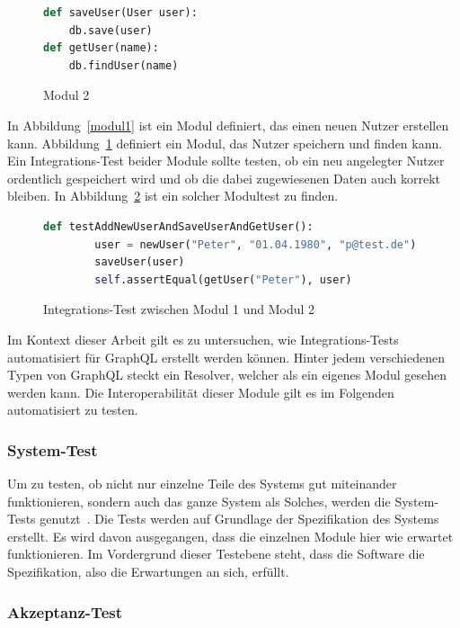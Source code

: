 \begin{figure}[h!]
    \begin{lstlisting}[language=Python]
def saveUser(User user):
    db.save(user)
def getUser(name):
    db.findUser(name)
    \end{lstlisting}
    \caption{Modul 2}
    \label{modul2}
\end{figure}

In Abbildung~\ref{modul1} ist ein Modul definiert, das einen neuen Nutzer erstellen kann.
Abbildung~\ref{modul2} definiert ein Modul, das Nutzer speichern und finden kann.
Ein Integrations-Test beider Module sollte testen, ob ein neu angelegter Nutzer ordentlich gespeichert wird und ob die dabei zugewiesenen Daten auch korrekt bleiben.
In Abbildung~\ref{integtest} ist ein solcher Modultest zu finden.

\begin{figure}[h!]
    \begin{lstlisting}[language=Python]
def testAddNewUserAndSaveUserAndGetUser():
        user = newUser("Peter", "01.04.1980", "p@test.de")
        saveUser(user)
        self.assertEqual(getUser("Peter"), user)
    \end{lstlisting}
    \caption{Integrations-Test zwischen Modul 1 und Modul 2}
    \label{integtest}
\end{figure}

Im Kontext dieser Arbeit gilt es zu untersuchen, wie Integrations-Tests automatisiert für GraphQL erstellt werden können.
Hinter jedem verschiedenen Typen von GraphQL steckt ein Resolver, welcher als ein eigenes Modul gesehen werden kann.
Die Interoperabilität dieser Module gilt es im Folgenden automatisiert zu testen.

\subsubsection{System-Test}

Um zu testen, ob nicht nur einzelne Teile des Systems gut miteinander funktionieren, sondern auch das ganze System als
Solches, werden die System-Tests genutzt~\cite[vgl. S. 6]{software-testing}.
Die Tests werden auf Grundlage der Spezifikation des Systems erstellt.
Es wird davon ausgegangen, dass die einzelnen Module hier wie erwartet funktionieren.
Im Vordergrund dieser Testebene steht, dass die Software die Spezifikation, also die Erwartungen an sich, erfüllt.

\subsubsection{Akzeptanz-Test}

